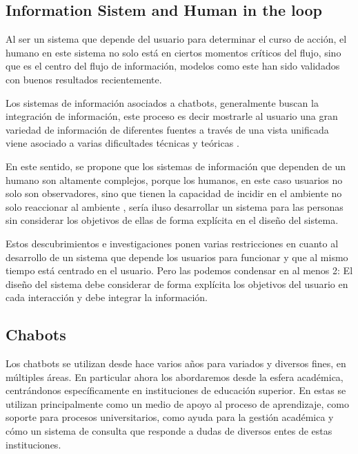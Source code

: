     \subsection{Information Sistem and Human in the loop}
    \par Al ser un sistema que depende del usuario para determinar el curso de acción, el humano en este sistema no solo está en ciertos momentos críticos del flujo, sino que es el centro del flujo de información, modelos como este han sido validados con buenos resultados \cite{Smith2018} recientemente.
    \par Los sistemas de información asociados a chatbots, generalmente buscan la integración de información, este proceso es decir mostrarle al usuario una gran variedad de información de diferentes fuentes a través de una vista unificada viene asociado a varias dificultades técnicas y teóricas \cite{Li2017}.
    \par En este sentido, se propone que los sistemas de información que dependen de un humano son altamente complejos, porque los humanos, en este caso usuarios no solo son observadores, sino que tienen la capacidad de incidir en el ambiente no solo reaccionar al ambiente \cite{McBride2021}, sería iluso desarrollar un sistema para las personas sin considerar los objetivos de ellas de forma explícita en el diseño del sistema.
    \par Estos descubrimientos e investigaciones ponen varias restricciones en cuanto al desarrollo de un sistema que depende los usuarios para funcionar y que al mismo tiempo está centrado en el usuario. Pero las podemos condensar en al menos 2: El diseño del sistema debe considerar de forma explícita los objetivos del usuario en cada interacción y debe integrar la información.
    \subsection{Chabots}
    \par Los chatbots se utilizan desde hace varios años para variados y diversos fines, en múltiples áreas. En particular ahora los abordaremos desde la esfera académica, centrándonos específicamente en instituciones de educación superior.
    En estas se utilizan principalmente como un medio de apoyo al proceso de aprendizaje, como soporte para procesos universitarios, como ayuda para la gestión académica y cómo un sistema de consulta que responde a dudas de diversos entes de estas instituciones.
    
